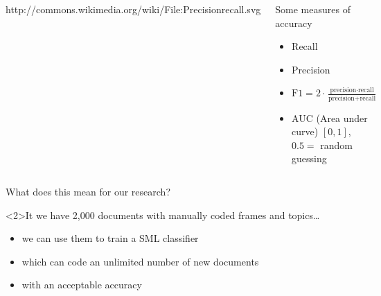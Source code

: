 \documentclass{beamer}
\begin{document}
{
\begin{frame}[plain]
\end{frame}

\begin{frame}[plain]
\end{frame}

\begin{frame}[plain]
\end{frame}
}

\begin{frame}[plain]
\begin{columns}[]

{\tiny{http://commons.wikimedia.org/wiki/File:Precisionrecall.svg}}

\begin{block}{Some measures of accuracy}
\begin{itemize}
\item Recall
\item Precision
\item $\text{F1}=2\cdot \frac{\text{precision}\cdot \text{recall}}{\text{precision}+\text{recall}}$
\item AUC (Area under curve) $[0,1]$, $0.5=$ random guessing
\end{itemize}
\end{block}


\end{columns}

\end{frame}





\begin{frame}{What does this mean for our research?}
\begin{block}<2>{It we have 2,000 documents with manually coded frames and topics\ldots}
\begin{itemize}
\item we can use them to train a SML classifier
\item which can code an unlimited number of new documents
\item with an acceptable accuracy
\end{itemize}
\end{block}
\end{frame}
\end{document}
